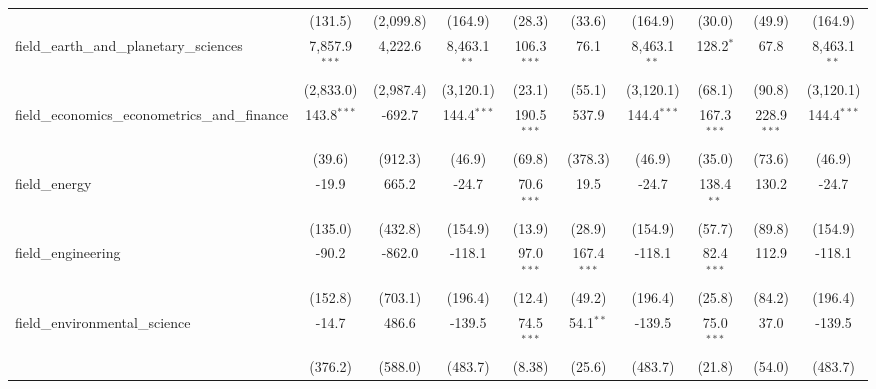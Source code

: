 \begin{tabular}{lccccccccc}
                                                               & (131.5)         & (2,099.8)       & (164.9)        & (28.3)        & (33.6)        & (164.9)        & (30.0)         & (49.9)        & (164.9)\\   
   field\_earth\_and\_planetary\_sciences                      & 7,857.9$^{***}$ & 4,222.6         & 8,463.1$^{**}$ & 106.3$^{***}$ & 76.1          & 8,463.1$^{**}$ & 128.2$^{*}$    & 67.8          & 8,463.1$^{**}$\\   
                                                               & (2,833.0)       & (2,987.4)       & (3,120.1)      & (23.1)        & (55.1)        & (3,120.1)      & (68.1)         & (90.8)        & (3,120.1)\\   
   field\_economics\_econometrics\_and\_finance                & 143.8$^{***}$   & -692.7          & 144.4$^{***}$  & 190.5$^{***}$ & 537.9         & 144.4$^{***}$  & 167.3$^{***}$  & 228.9$^{***}$ & 144.4$^{***}$\\   
                                                               & (39.6)          & (912.3)         & (46.9)         & (69.8)        & (378.3)       & (46.9)         & (35.0)         & (73.6)        & (46.9)\\   
   field\_energy                                               & -19.9           & 665.2           & -24.7          & 70.6$^{***}$  & 19.5          & -24.7          & 138.4$^{**}$   & 130.2         & -24.7\\   
                                                               & (135.0)         & (432.8)         & (154.9)        & (13.9)        & (28.9)        & (154.9)        & (57.7)         & (89.8)        & (154.9)\\   
   field\_engineering                                          & -90.2           & -862.0          & -118.1         & 97.0$^{***}$  & 167.4$^{***}$ & -118.1         & 82.4$^{***}$   & 112.9         & -118.1\\   
                                                               & (152.8)         & (703.1)         & (196.4)        & (12.4)        & (49.2)        & (196.4)        & (25.8)         & (84.2)        & (196.4)\\   
   field\_environmental\_science                               & -14.7           & 486.6           & -139.5         & 74.5$^{***}$  & 54.1$^{**}$   & -139.5         & 75.0$^{***}$   & 37.0          & -139.5\\   
                                                               & (376.2)         & (588.0)         & (483.7)        & (8.38)        & (25.6)        & (483.7)        & (21.8)         & (54.0)        & (483.7)\\   

\end{tabular}
